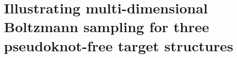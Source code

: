 \documentclass[10pt]{article}
\begin{document}
%

\section{Illustrating multi-dimensional Boltzmann sampling for three pseudoknot-free target structures}
\end{document}
